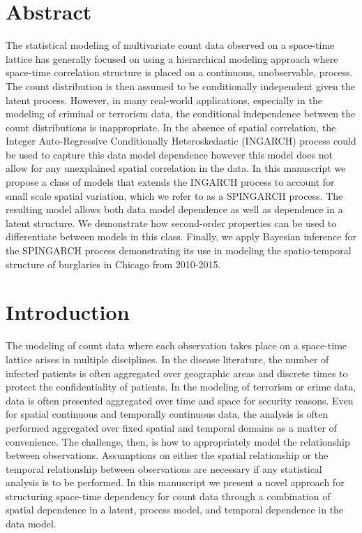 \documentclass[11pt]{isuthesis}
\begin{document}
\section*{Abstract}
	The statistical modeling of multivariate count data observed on a space-time lattice has generally focused on using a hierarchical modeling approach where space-time correlation structure is placed on a continuous, unobservable, process.  The count distribution is then assumed to be conditionally independent given the latent process.  However, in many real-world applications, especially in the modeling of criminal or terrorism data, the conditional independence between the count distributions is inappropriate.  In the absence of spatial correlation, the Integer Auto-Regressive Conditionally Heteroskedastic (INGARCH) process could be used to capture this data model dependence however this model does not allow for any unexplained spatial correlation in the data. In this manuscript we propose a class of models that extends the INGARCH process to account for small scale spatial variation, which we refer to as a SPINGARCH process. The resulting model allows both data model dependence as well as dependence in a latent structure.  We demonstrate how second-order properties can be used to differentiate between models in this class.  Finally, we apply Bayesian inference for the SPINGARCH process demonstrating its use in modeling the spatio-temporal structure of burglaries in Chicago from 2010-2015.


\section{Introduction} 

The modeling of count data where each observation takes place on a space-time lattice arises in multiple disciplines.  In the disease literature, the number of infected patients is often aggregated over geographic areas and discrete times to protect the confidentiality of patients.  In the modeling of terrorism or crime data, data is often presented aggregated over time and space for security reasons.  Even for spatial continuous and temporally continuous data, the analysis is often performed aggregated over fixed spatial and temporal domains as a matter of convenience.  The challenge, then, is how to appropriately model the relationship between observations.  Assumptions on either the spatial relationship or the temporal relationship between observations are necessary if any statistical analysis is to be performed.  In this manuscript we present a novel approach for structuring space-time dependency for count data through a combination of spatial dependence in a latent, process model, and temporal dependence in the data model.
\end{document}
